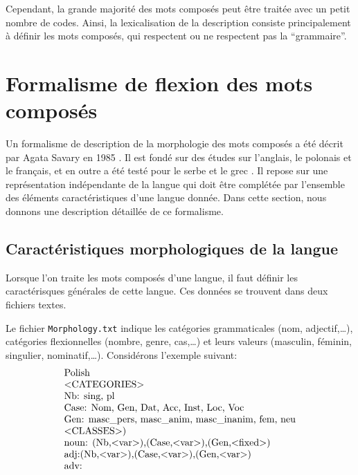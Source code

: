 \bigskip
\noindent Cependant, la grande majorité des mots composés peut être traitée avec un petit nombre de codes. Ainsi, la lexicalisation de la
description consiste principalement à définir les mots composés, qui respectent ou ne respectent pas
la  ``grammaire''.

\section{Formalisme de flexion des mots composés}
\label{section:formalism}
Un formalisme de description de la morphologie des mots composés a été décrit par Agata Savary en
1985 \cite{Savary05}. Il est fondé sur des études sur l'anglais, le polonais et le français, et
en outre a été testé pour le serbe \cite{Krstevetal06} et le grec \cite{Foufi13}.
Il repose sur une représentation indépendante de la langue qui doit être complétée par l'ensemble des éléments caractéristiques 
d'une langue donnée. Dans cette section, nous donnons une description détaillée de ce formalisme.

\subsection{Caractéristiques morphologiques de la langue}
\label{subsec:langfeat}
Lorsque l'on traite les mots composés d'une langue, il faut définir les caractérisques générales
de cette langue. Ces données se trouvent dans deux fichiers textes.

\bigskip
\noindent Le fichier \verb+Morphology.txt+  indique les catégories grammaticales
(nom, adjectif,\dots), catégories flexionnelles (nombre, genre, cas,\dots) et leurs valeurs 
(masculin, féminin, singulier, nominatif,\dots). Considérons l'exemple suivant:
\[
\begin{array}[c]{ll}
$Polish$ \\
$$<$CATEGORIES$>$$ \\
$Nb: sing, pl$ \\
$Case: Nom, Gen, Dat, Acc, Inst, Loc, Voc$ \\
$Gen: masc\_pers, masc\_anim, masc\_inanim, fem, neu$ \\
$$<$CLASSES$>$)$ \\
$noun: (Nb,$<$var$>$),(Case,$<$var$>$),(Gen,$<$fixed$>$)$ \\
$adj:(Nb,$<$var$>$),(Case,$<$var$>$),(Gen,$<$var$>$)$ \\
$adv:$
\end{array}
\]

